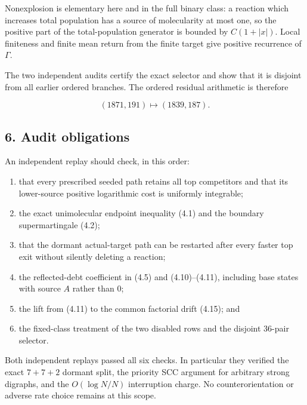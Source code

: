 Nonexplosion is elementary here and in the full binary class: a reaction
which increases total population has a source of molecularity at most
one, so the positive part of the total-population generator is bounded
by \(C(1+|x|)\). Local finiteness and finite mean return from the finite
target give positive recurrence of \(\Gamma\).

The two independent audits certify the exact selector and show that it
is disjoint from all earlier ordered branches. The ordered residual
arithmetic is therefore

\[
 (1871,191)\longmapsto(1839,187).                       \tag{5.2}
\]

\subsection{6. Audit obligations}

An independent replay should check, in this order:

\begin{enumerate}
\def\labelenumi{\arabic{enumi}.}
\tightlist
\item
  that every prescribed seeded path retains all top competitors and that
  its lower-source positive logarithmic cost is uniformly integrable;
\item
  the exact unimolecular endpoint inequality (4.1) and the boundary
  supermartingale (4.2);
\item
  that the dormant actual-target path can be restarted after every
  faster top exit without silently deleting a reaction;
\item
  the reflected-debt coefficient in (4.5) and (4.10)--(4.11), including
  base states with source \(A\) rather than \(0\);
\item
  the lift from (4.11) to the common factorial drift (4.15); and
\item
  the fixed-class treatment of the two disabled rows and the disjoint
  36-pair selector.
\end{enumerate}

Both independent replays passed all six checks. In particular they
verified the exact \(7+7+2\) dormant split, the priority SCC argument
for arbitrary strong digraphs, and the \(O(\log N/N)\) interruption
charge. No counterorientation or adverse rate choice remains at this
scope.
